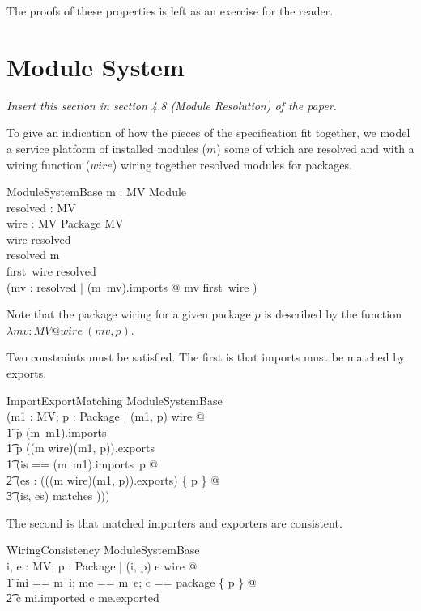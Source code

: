 \documentclass[a4paper,9pt]{article}
\begin{document}
The proofs of these properties is left as an exercise for the reader.

\clearpage
\section{Module System}
\label{cha:splat}
\textit{Insert this section in section 4.8 (Module Resolution) of the paper.}

To give an indication of how the pieces of the specification fit together,
we model a service
platform of installed modules ($m$)
some of which are resolved and with a wiring function ($wire$) wiring together
resolved modules for packages.
\begin{schema}{ModuleSystemBase}
  m : MV \pinj Module \\
  resolved : \power MV \\
  wire : MV \cross Package \pfun MV \\
\where
 \ran wire \subseteq resolved \\
 resolved \subseteq \dom m \\
 first~\limg \dom wire \rimg \subseteq resolved \\
 (\forall mv  : resolved | (m~mv).imports \neq \emptyset @ mv \in first~\limg \dom wire \rimg )
\end{schema}

Note that the package wiring for a given package $p$ is described by the
function $\lambda mv : MV @ wire~(mv, p)$.

Two constraints must be satisfied. The first is that imports must be
matched by exports.
\begin{schema}{ImportExportMatching}
  ModuleSystemBase \\
\where
  (\forall m1 : MV; p : Package | (m1, p) \in \dom wire @ \\
\t1 p \in \dom (m~m1).imports \land \\
\t1 p \in \dom ((m \circ wire)(m1, p)).exports \land \\
\t1 (\LET is == (m~m1).imports~p @ \\
\t2 (\exists es : (((m \circ wire)(m1, p)).exports) \limg \{ p \} \rimg @ \\
\t3 (is, es) \in matches ))) \\
\end{schema}

The second is that matched importers and exporters are consistent.
\begin{schema}{WiringConsistency}
  ModuleSystemBase \\
\where
  \forall i, e : MV; p : Package | (i, p) \mapsto e \in wire @ \\
\t1 \LET mi == m~i; me == m~e; c == package \inv \limg \{ p \} \rimg @ \\
\t2 c \dres mi.imported \subseteq c \dres me.exported \\ 
\end{schema}
\end{document}
